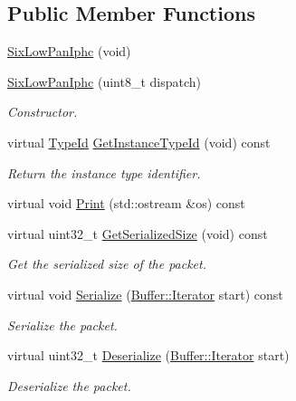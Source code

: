 \subsection*{Public Member Functions}
\begin{DoxyCompactItemize}
\item 
\hyperlink{classns3_1_1SixLowPanIphc_a8ec852c221e80512fb30c88fcc4732be}{Six\+Low\+Pan\+Iphc} (void)
\item 
\hyperlink{classns3_1_1SixLowPanIphc_a4c4dfa36503c3eceea87b13fd02ef41e}{Six\+Low\+Pan\+Iphc} (uint8\+\_\+t dispatch)
\begin{DoxyCompactList}\small\item\em Constructor. \end{DoxyCompactList}\item 
virtual \hyperlink{classns3_1_1TypeId}{Type\+Id} \hyperlink{classns3_1_1SixLowPanIphc_a7541d7304adebf94f3b027f367230c78}{Get\+Instance\+Type\+Id} (void) const 
\begin{DoxyCompactList}\small\item\em Return the instance type identifier. \end{DoxyCompactList}\item 
virtual void \hyperlink{classns3_1_1SixLowPanIphc_a160b0c6909b26e2c045685acd6546adf}{Print} (std\+::ostream \&os) const 
\item 
virtual uint32\+\_\+t \hyperlink{classns3_1_1SixLowPanIphc_ac89147a290ccad52b27d0811b8a9b687}{Get\+Serialized\+Size} (void) const 
\begin{DoxyCompactList}\small\item\em Get the serialized size of the packet. \end{DoxyCompactList}\item 
virtual void \hyperlink{classns3_1_1SixLowPanIphc_a55103930a63fbf10e5a49b5b780980f3}{Serialize} (\hyperlink{classns3_1_1Buffer_1_1Iterator}{Buffer\+::\+Iterator} start) const 
\begin{DoxyCompactList}\small\item\em Serialize the packet. \end{DoxyCompactList}\item 
virtual uint32\+\_\+t \hyperlink{classns3_1_1SixLowPanIphc_a440f2c49e023aea9c5dd19052e08cddc}{Deserialize} (\hyperlink{classns3_1_1Buffer_1_1Iterator}{Buffer\+::\+Iterator} start)
\begin{DoxyCompactList}\small\item\em Deserialize the packet. \end{DoxyCompactList}\item 

\end{DoxyCompactItemize}
